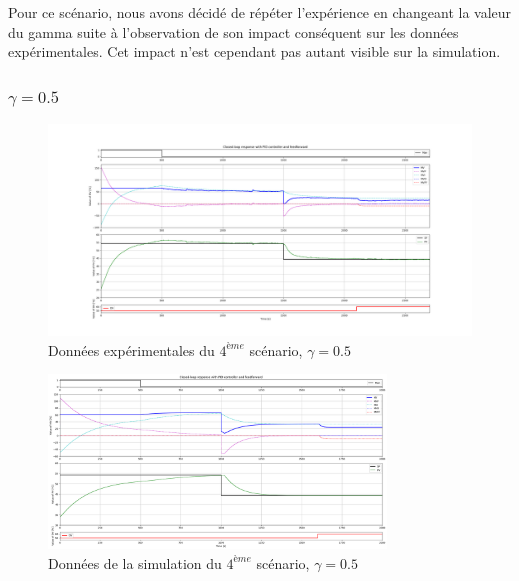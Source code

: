 Pour ce scénario, nous avons décidé de répéter l'expérience en changeant la valeur du gamma suite à l'observation de son impact conséquent sur les données expérimentales.
Cet impact n'est cependant pas autant visible sur la simulation.

\subsubsection{$\gamma = 0.5$}

\begin{figure}[H]
	\centering
	\includegraphics[width=1\textwidth]{../Plots/Experiment_scenario_7_2024-03-29-17h44.png}
	\caption{Données expérimentales du $4^{ème}$ scénario, $\gamma = 0.5$}
	\label{fig:exp_scenario5_0.5}
\end{figure}
\begin{figure}[H]
	\centering
	\includegraphics[width=0.8\textwidth]{figures/scenario7.png}
	\caption{Données de la simulation du $4^{ème}$ scénario, $\gamma = 0.5$}
	\label{fig:sim_scenario5_0.5}
\end{figure}

